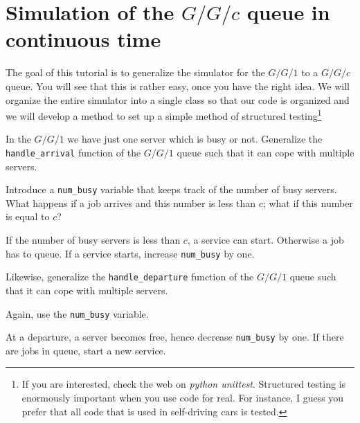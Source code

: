 \documentclass{scrartcl}
\begin{document}
\section{Simulation of the $G/G/c$ queue in continuous time}
\label{sec:ggc-continuous-time}

The goal of this tutorial is to  generalize the simulator for the $G/G/1$ to a $G/G/c$ queue. You will see that this is rather easy, once you have the right idea. We will organize the entire simulator into a single class so that our code is organized and we will develop a method to set up a simple method of structured  testing\footnote{If you are interested, check the web on  \emph{python unittest}. Structured testing is enormously important when you use code for real. For instance, I guess you prefer that all code that is used in self-driving cars is tested.} 


\begin{exercise}
In the $G/G/1$ we have just one server which is busy or not.
  Generalize  the \texttt{handle\_arrival} function of the $G/G/1$ queue such that it can cope with multiple servers.

  \hintsymbol\begin{hint}
  Introduce a \texttt{num\_busy} variable that keeps track of the number of busy servers. What happens if a job arrives and this number is less than $c$; what if this number is equal to $c$?
  \end{hint}
  \begin{solution}
    If the number of busy servers is less than $c$, a service can start. Otherwise a job has to queue. If a service starts, increase \texttt{num\_busy} by one. 
  \end{solution}
\end{exercise}


\begin{exercise}
Likewise,   generalize  the \texttt{handle\_departure} function of the $G/G/1$ queue such that it can cope with multiple servers.
\hintsymbol\begin{hint}
  Again, use the \texttt{num\_busy} variable. 
\end{hint}

\begin{solution}
  At a departure, a server becomes free, hence decrease \texttt{num\_busy} by one. If there are jobs in queue, start a new service.
\end{solution}
\end{exercise}
\end{document}
